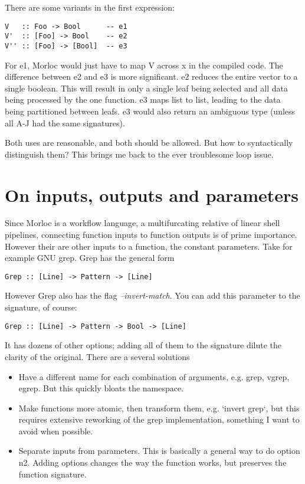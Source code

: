 \documentclass[12pt]{article}
\begin{document}
There are some variants in the first expression:

\begin{verbatim}
V   :: Foo -> Bool      -- e1
V'  :: [Foo] -> Bool    -- e2
V'' :: [Foo] -> [Bool]  -- e3
\end{verbatim}

For e1, Morloc would just have to map V across x in the compiled code. The
difference between e2 and e3 is more significant. e2 reduces the entire vector
to a single boolean. This will result in only a single leaf being selected and
all data being processed by the one function. e3 maps list to list, leading to
the data being partitioned between leafs. e3 would also return an ambiguous
type (unless all A-J had the same signatures).

Both uses are reasonable, and both should be allowed. But how to syntactically
distinguish them? This brings me back to the ever troublesome loop issue.

\section{On inputs, outputs and parameters}

Since Morloc is a workflow language, a multifurcating relative of linear shell
pipelines, connecting function inputs to function outputs is of prime
importance. However their are other inputs to a function, the constant
parameters. Take for example GNU grep. Grep has the general form

\begin{verbatim}
Grep :: [Line] -> Pattern -> [Line]
\end{verbatim}

However Grep also has the flag {\it --invert-match}. You can add this parameter to the signature, of course:

\begin{verbatim}
Grep :: [Line] -> Pattern -> Bool -> [Line]
\end{verbatim}

It has dozens of other options; adding all of them to the signature dilute the
clarity of the original. There are a several solutions

\begin{itemize}
 \item Have a different name for each combination of arguments, e.g. grep, vgrep,
    egrep. But this quickly bloats the namespace.
 \item Make functions more atomic, then transform them, e.g. `invert grep`, but
    this requires extensive reworking of the grep implementation, something
    I want to avoid when possible. 
 \item Separate inputs from parameters. This is basically a general way to do
    option n2. Adding options changes the way the function works, but preserves
    the function signature.
\end{itemize}
\end{document}
